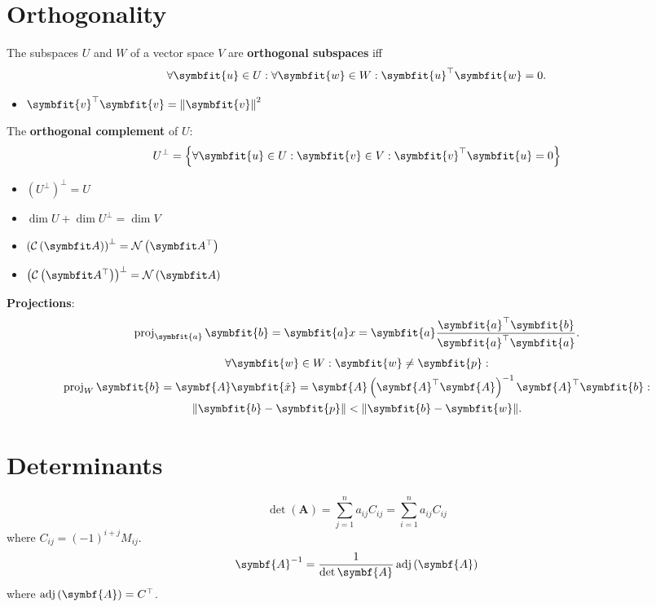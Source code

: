 \documentclass{article}
\begin{document}
\begin{minipage}[t]{62.39259259mm}
    \section*{Orthogonality}
    The subspaces \(U\) and \(W\) of a vector space \(V\) are
    \textbf{orthogonal subspaces} iff
    \begin{equation*}
        \forall \symbfit{u}\in U:\forall \symbfit{w}\in W:\symbfit{u}^{\top}\symbfit{w} = 0.
    \end{equation*}
    \begin{itemize}
        \item \(\symbfit{v}^\top \symbfit{v}=\norm{\symbfit{v}}^2\)
    \end{itemize}
    The \textbf{orthogonal complement} of \(U\):
    \begin{equation*}
        U^{\perp} = \left\{ \forall \symbfit{u}\in U:\symbfit{v}\in V: \symbfit{v}^{\top}\symbfit{u}=0 \right\}
    \end{equation*}
    \begin{itemize}
        \item \(\left( U^{\perp} \right)^{\perp} = U\)
        \item \(\dim{U} + \dim{U^{\perp}} = \dim{V}\)
        \item \(\left( \columnspace{A} \right)^\perp = \leftnullspace{A}\)
        \item \(\left( \rowspace{A} \right)^\perp = \nullspace{A}\)
    \end{itemize}
    \textbf{Projections}:
    \begin{equation*}
        \proj_{\symbfit{a}}\symbfit{b}
        = \symbfit{a} x
        = \symbfit{a} \frac{\symbfit{a}^\top \symbfit{b}}{\symbfit{a}^\top \symbfit{a}}.
    \end{equation*}
    \begin{gather*}
        \forall \symbfit{w}\in W:\symbfit{w}\neq \symbfit{p}: \\
        \proj_{W}\symbfit{b} = \symbf{A}\symbfit{\hat{x}} = \symbf{A}\left( \symbf{A}^\top \symbf{A} \right)^{-1}\symbf{A}^\top \symbfit{b}: \\
        \norm{\symbfit{b}-\symbfit{p}}<\norm{\symbfit{b}-\symbfit{w}}.
    \end{gather*}
    \section*{Determinants}
    \begin{equation*}
        \det{\left( \symbf{A} \right)} = \sum_{j=1}^n a_{ij}C_{ij} = \sum_{i=1}^n a_{ij}C_{ij}
    \end{equation*}
    where \(C_{ij}=\left( -1 \right)^{i+j}M_{ij}\).
    \begin{equation*}
        \symbf{A}^{-1}=\frac{1}{\det{\symbf{A}}} \adj{\left( \symbf{A} \right)}
    \end{equation*}
    where \(\adj{\left( \symbf{A} \right)}=C^\top\).
\end{minipage}\hfill%
\end{document}
